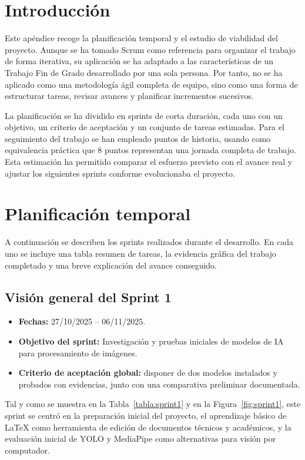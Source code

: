 
\section{Introducción}

Este apéndice recoge la planificación temporal y el estudio de viabilidad del proyecto. Aunque se ha tomado Scrum como referencia para organizar el trabajo de forma iterativa, su aplicación se ha adaptado a las características de un Trabajo Fin de Grado desarrollado por una sola persona. Por tanto, no se ha aplicado como una metodología ágil completa de equipo, sino como una forma de estructurar tareas, revisar avances y planificar incrementos sucesivos.

La planificación se ha dividido en sprints de corta duración, cada uno con un objetivo, un criterio de aceptación y un conjunto de tareas estimadas. Para el seguimiento del trabajo se han empleado puntos de historia, usando como equivalencia práctica que 8 puntos representan una jornada completa de trabajo. Esta estimación ha permitido comparar el esfuerzo previsto con el avance real y ajustar los siguientes sprints conforme evolucionaba el proyecto.

\section{Planificación temporal}

A continuación se describen los sprints realizados durante el desarrollo. En cada uno se incluye una tabla resumen de tareas, la evidencia gráfica del trabajo completado y una breve explicación del avance conseguido.

\subsection*{Visión general del Sprint 1}
\begin{itemize}
	\item \textbf{Fechas:} 27/10/2025 -- 06/11/2025.
	\item \textbf{Objetivo del sprint:} Investigación y pruebas iniciales de modelos de IA para procesamiento de imágenes.
	\item \textbf{Criterio de aceptación global:} disponer de dos modelos instalados y probados con evidencias, junto con una comparativa preliminar documentada.
\end{itemize}


Tal y como se muestra en la Tabla~\ref{tabla:sprint1} y en la Figura~\ref{fig:sprint1}, este sprint se centró en la preparación inicial del proyecto, el aprendizaje básico de \LaTeX{} como herramienta de edición de documentos técnicos y académicos, y la evaluación inicial de YOLO y MediaPipe como alternativas para visión por computador.

